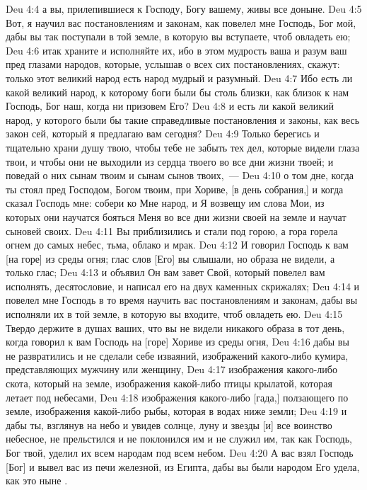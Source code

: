 \vs Deu 4:4 а вы, прилепившиеся к Господу, Богу вашему, живы все доныне.
\vs Deu 4:5 Вот, я научил вас постановлениям и законам, как повелел мне Господь, Бог мой, дабы вы так поступали в той земле, в которую вы вступаете, чтоб овладеть ею;
\vs Deu 4:6 итак храните и исполняйте их, ибо в этом мудрость ваша и разум ваш пред глазами народов, которые, услышав о всех сих постановлениях, скажут: только этот великий народ есть народ мудрый и разумный.
\vs Deu 4:7 Ибо есть ли какой великий народ, к которому боги  были бы столь близки, как близок к нам Господь, Бог наш, когда ни призовем Его?
\vs Deu 4:8 и есть ли какой великий народ, у которого были бы такие справедливые постановления и законы, как весь закон сей, который я предлагаю вам сегодня?
\vs Deu 4:9 Только берегись и тщательно храни душу твою, чтобы тебе не забыть тех дел, которые видели глаза твои, и чтобы они не выходили из сердца твоего во все дни жизни твоей; и поведай о них сынам твоим и сынам сынов твоих,~---
\vs Deu 4:10 о том дне, когда ты стоял пред Господом, Богом твоим, при Хориве, [в день собрания,] и когда сказал Господь мне: собери ко Мне народ, и Я возвещу им слова Мои, из которых они научатся бояться Меня во все дни жизни своей на земле и научат сыновей своих.
\vs Deu 4:11 Вы приблизились и стали под горою, а гора горела огнем до самых небес,  тьма, облако и мрак.
\vs Deu 4:12 И говорил Господь к вам [на горе] из среды огня; глас слов [Его] вы слышали, но образа не видели, а только глас;
\vs Deu 4:13 и объявил Он вам завет Свой, который повелел вам исполнять, десятословие, и написал его на двух каменных скрижалях;
\vs Deu 4:14 и повелел мне Господь в то время научить вас постановлениям и законам, дабы вы исполняли их в той земле, в которую вы входите, чтоб овладеть ею.
\vs Deu 4:15 Твердо держите в душах ваших, что вы не видели никакого образа в тот день, когда говорил к вам Господь на [горе] Хориве из среды огня,
\vs Deu 4:16 дабы вы не развратились и не сделали себе изваяний, изображений какого-либо кумира, представляющих мужчину или женщину,
\vs Deu 4:17 изображения какого-либо скота, который на земле, изображения какой-либо птицы крылатой, которая летает под небесами,
\vs Deu 4:18 изображения какого-либо [гада,] ползающего по земле, изображения какой-либо рыбы, которая в водах ниже земли;
\vs Deu 4:19 и дабы ты, взглянув на небо и увидев солнце, луну и звезды [и] все воинство небесное, не прельстился и не поклонился им и не служил им, так как Господь, Бог твой, уделил их всем народам под всем небом.
\vs Deu 4:20 А вас взял Господь [Бог] и вывел вас из печи железной, из Египта, дабы вы были народом Его удела, как это ныне .
